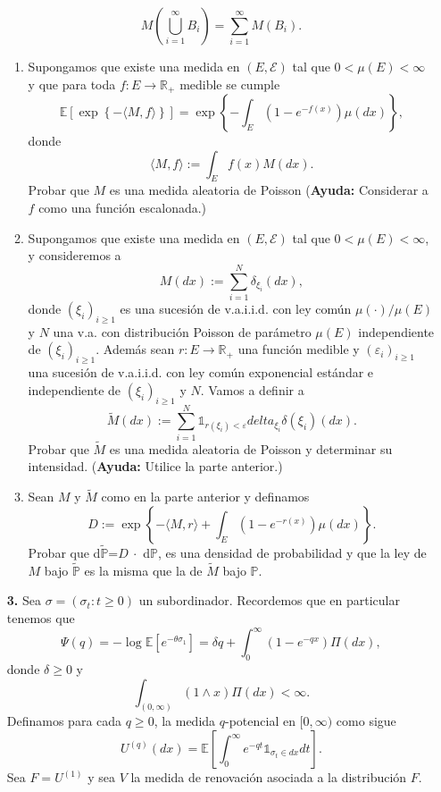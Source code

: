\documentclass[letterpaper]{article}
\newcommand{\R}{\mathbb{R}}
\renewcommand{\to}{\rightarrow}
\newcommand{\E}{\mathbb{E}}
\renewcommand{\P}{\mathbb{P}}
\newcommand{\1}{\mathds{1}}
\theoremstyle{definition}
\theoremstyle{definition}
\theoremstyle{definition}
\theoremstyle{definition}
\theoremstyle{definition}
\begin{document}
\begin{enumerate}
\[        M \left(\bigcup_{i=1}^\infty B_i\right)=\sum_{i=1}^{\infty}M(B_i).
    \]
    \begin{enumerate}
        \item Supongamos que existe una medida en $(E,\mathcal{E})$ tal que $0<\mu(E)<\infty$ y que para toda $f:E\to \R_+$ medible se cumple 
        \[
            \E\left[\exp \left\{-\langle M,f\rangle\right\}\right]=\exp \left\{-\int_E(1-e^{-f(x)})\mu(dx)\right\},
        \]
        donde 
        \[
            \langle M,f\rangle:=\int_E f(x)M(dx).
        \]
        Probar que $M$ es una medida aleatoria de Poisson (\textbf{Ayuda:} Considerar a $f$ como una función escalonada.)
        \item Supongamos que existe una medida en $(E,\mathcal{E})$ tal que $0<\mu(E)<\infty$, y consideremos a 
        \[
            M(dx):=\sum_{i=1}^{N}\delta_{\xi_i}(dx),
        \]
        donde $(\xi_i)_{i\geq1}$ es una sucesión de v.a.i.i.d. con ley común $\mu(\cdot)/\mu(E)$ y $N$ una v.a. con distribución Poisson de parámetro $\mu(E)$ independiente de $(\xi_i)_{i\geq1}$. Además sean $r:E\to \R_+$ una función medible y $(\varepsilon_i)_{i\geq1}$ una sucesión de v.a.i.i.d. con ley común exponencial estándar e independiente de $(\xi_i)_{i\geq1}$ y $N$. Vamos a definir a 
        \[
            \widetilde{M}(dx):=\sum_{i=1}^{N}\1_{r(\xi_i)<\varepsilon}delta_{\xi_i}\delta(\xi_i)(dx).
        \] 
        Probar que $\widetilde{M}$ es una medida aleatoria de Poisson y determinar su intensidad. (\textbf{Ayuda:} Utilice la parte anterior.)
        \item Sean $M$ y $\widetilde{M}$ como en la parte anterior y definamos 
        \[
            D:=\exp \left\{-\langle M,r\rangle+\int_E \left(1-e^{-r(x)}\right)\mu(dx)\right\}.
        \]
        Probar que d$\widetilde{\P}$=$D\ \cdot$ d$\P$, es una densidad de probabilidad y que la ley de $M$ bajo $\widetilde{\P}$ es la misma que la de $\widetilde{M}$ bajo $\P$.
    \end{enumerate}
    \item[\textbf{3.}] Sea $\sigma=(\sigma_t:t\geq0)$ un subordinador. Recordemos que en particular tenemos que 
    \[
        \Psi(q)=-\log \E\left[e^{-\theta\sigma_1}\right]=\delta q+\int_{0}^{\infty}(1-e^{-qx})\Pi(dx),
    \]
    donde $\delta\geq0$ y 
    \[
        \int_{(0,\infty)}(1\wedge x)\Pi(dx)<\infty.
    \]
    Definamos para cada $q\geq0$, la medida $q$-potencial en $[0,\infty)$ como sigue
    \[
        U^(q)(dx)=\E\left[\int_{0}^{\infty}e^{-qt}\1_{\sigma_t\in dx}dt\right].
    \]
    Sea $F=U^{(1)}$ y sea $V$ la medida de renovación asociada a la distribución $F$.

\end{enumerate}
\end{document}
